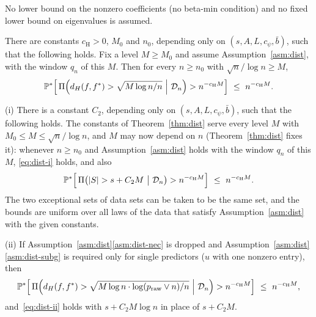 No lower bound on the nonzero coefficients (no beta-min condition) and no fixed lower bound on eigenvalues is assumed.

\begin{theorem}\label{thm:dist}
There are constants $c_{\mathrm H}>0$, $M_0$ and $n_0$, depending only on $(s,A,L,c_\psi,\bar b)$, such that the following
holds. Fix a level $M\ge M_0$ and assume Assumption~\ref{asm:dist}, with the window $q_n$ of this $M$. Then for every
$n\ge n_0$ with $\sqrt n/\log n\ge M$,
\begin{equation}\label{eq:dist-i}
  \P^*\Big[\,\Pi\Big(d_H(f,f^*)>\sqrt{M\log n/n}\ \Big|\ \Dn\Big)>n^{-c_{\mathrm H} M}\Big]\ \le\ n^{-c_{\mathrm H} M}.
\end{equation}
\end{theorem}



\begin{proposition}\label{prop:dist}
\textup{(i)} There is a constant $C_2$, depending only on $(s,A,L,c_\psi,\bar b)$, such that the following holds. The
constants of Theorem~\ref{thm:dist} serve every level $M$ with $M_0\le M\le\sqrt n/\log n$, and $M$ may now depend on $n$
(Theorem~\ref{thm:dist} fixes it): whenever $n\ge n_0$ and Assumption~\ref{asm:dist} holds with the window $q_n$ of this $M$,
\eqref{eq:dist-i} holds, and also
\begin{equation}\label{eq:dist-ii}
  \P^*\Big[\,\Pi\big(\abs{S}>s+C_2M\ \big|\ \Dn\big)>n^{-c_{\mathrm H} M}\Big]\ \le\ n^{-c_{\mathrm H} M}.
\end{equation}
The two exceptional sets of data sets can be taken to be the same set, and the bounds are uniform over all laws of the
data that satisfy Assumption~\ref{asm:dist} with the given constants.

\textup{(ii)} If Assumption~\ref{asm:dist}\ref{asm:dist-nec} is dropped and Assumption~\ref{asm:dist}\ref{asm:dist-subg} is
required only for single predictors ($u$ with one nonzero entry), then
\begin{equation}\label{eq:dist-iii}
  \mathbb{P}^*\Big[\,\Pi\Big(d_H(f,f^*)>\sqrt{M\log n\cdot\log(p_{\mathrm{raw}}\vee n)/n}\ \Big|\ \mathcal D_n\Big)>n^{-c_{\mathrm H} M}\Big]\ \le\ n^{-c_{\mathrm H} M},
\end{equation}
and~\eqref{eq:dist-ii} holds with $s+C_2M\log n$ in place of $s+C_2M$.
\end{proposition}

